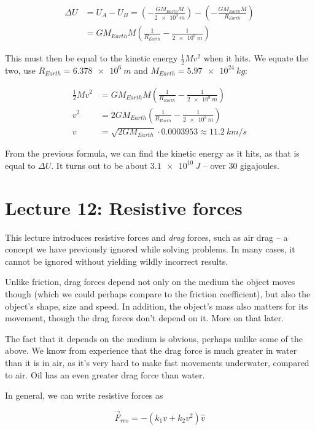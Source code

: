 \begin{align}
\Delta U &= U_A - U_B = \left(-\frac{G M_{Earth} M}{\SI{2e9}{m}}\right) - \left(-\frac{G M_{Earth} M}{R_{Earth}}\right)\\
         &= G M_{Earth} M \left( \frac{1}{R_{Earth}} - \frac{1}{\SI{2e9}{m}} \right)
\end{align}

This must then be equal to the kinetic energy $\displaystyle \frac{1}{2} M v^2$ when it hits. We equate the two, use $R_{Earth} = \SI{6.378e6}{m}$ and $M_{Earth} = \SI{5.97e24}{kg}$:

\begin{align}
\frac{1}{2} M v^2 &= G M_{Earth} M \left( \frac{1}{R_{Earth}} - \frac{1}{\SI{2e9}{m}} \right)\\
v^2 &= 2 G M_{Earth} \left( \frac{1}{R_{Earth}} - \frac{1}{\SI{2e9}{m}} \right)\\
v &= \sqrt{2 G M_{Earth}} \cdot 0.0003953 \approx \SI{11.2}{km/s}
\end{align}

From the previous formula, we can find the kinetic energy as it hits, as that is equal to $\Delta U$. It turns out to be about $\SI{3.1e10}{J}$ -- over 30 gigajoules.

\section{Lecture 12: Resistive forces}

This lecture introduces resistive forces and \emph{drag} forces, such as air drag -- a concept we have previously ignored while solving problems. In many cases, it cannot be ignored without yielding wildly incorrect results.

Unlike friction, drag forces depend not only on the medium the object moves though (which we could perhaps compare to the friction coefficient), but also the object's shape, size and speed. In addition, the object's mass also matters for its movement, though the drag forces don't depend on it. More on that later.

The fact that it depends on the medium is obvious, perhaps unlike some of the above. We know from experience that the drag force is much greater in water than it is in air, as it's very hard to make fast movements underwater, compared to air. Oil has an even greater drag force than water.

In general, we can write resistive forces as

\begin{equation}
\vec{F}_{res} = -\left( k_1 v + k_2 v^2 \right) \hat{v}
\end{equation}

